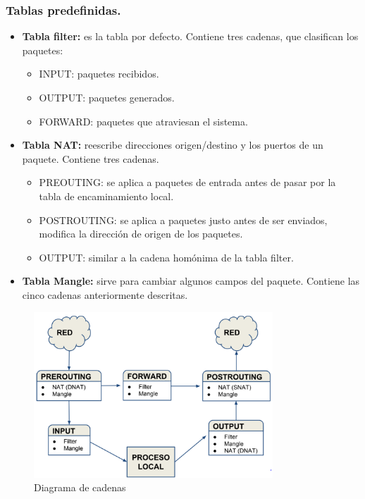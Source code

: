 \begin{onepage}
\subsubsection{Tablas predefinidas.}
\begin{itemize}
    \item \textbf{Tabla filter: }es la tabla por defecto. Contiene tres cadenas, que clasifican los paquetes:
        \begin{itemize}
            \item INPUT: paquetes recibidos.
            \item OUTPUT: paquetes generados.
            \item FORWARD: paquetes que atraviesan el sistema.
        \end{itemize}
    
    \item \textbf{Tabla NAT: }reescribe direcciones origen/destino y los puertos de un paquete. Contiene tres cadenas.
            \begin{itemize}
                \item PREOUTING: se aplica a paquetes de entrada antes de pasar por la tabla de encaminamiento local.
                \item POSTROUTING: se aplica a paquetes justo antes de ser enviados, modifica la dirección de origen de los paquetes.
                \item OUTPUT: similar a la cadena homónima de la tabla filter.
            \end{itemize}
    \item \textbf{Tabla Mangle: }sirve para cambiar algunos campos del paquete. Contiene las cinco cadenas anteriormente descritas.
    \end{itemize}
    \begin{figure}[H]
        \centering
        \includegraphics[width=0.8\textwidth]{img/GraficoCadenas.PNG}
        \caption{Diagrama de cadenas}
    \end{figure}
    \end{onepage}
